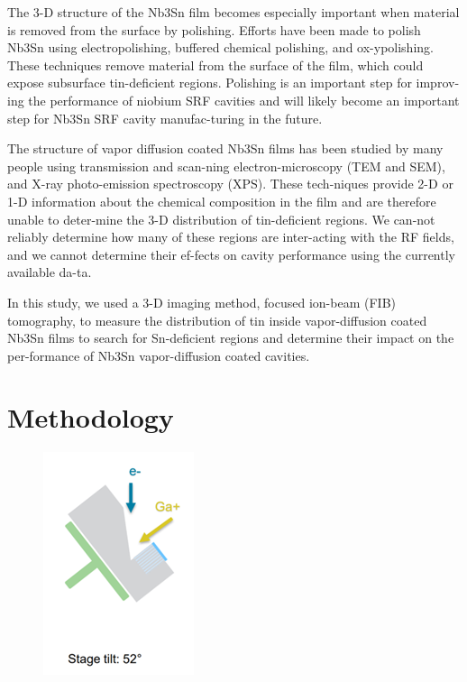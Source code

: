 The 3-D structure of the Nb3Sn film becomes especially important when material is removed from the surface by polishing. Efforts have been made to polish Nb3Sn using electropolishing\cite{hu2019reducing}, buffered chemical polishing\cite{hu2019reducing}, and ox-ypolishing\cite{pudasaini2018studies}. These techniques remove material from the surface of the film, which could expose subsurface tin-deficient regions. Polishing is an important step for improv-ing the performance of niobium SRF cavities and will likely become an important step for Nb3Sn SRF cavity manufac-turing in the future. 

The structure of vapor diffusion coated Nb3Sn films has been studied by many people using transmission and scan-ning electron-microscopy (TEM and SEM)\cite{lee2018atomic,becker2015analysis,hall2017surface,hall2016surface}, and X-ray photo-emission spectroscopy (XPS)\cite{pudasaini2019growth,sun2019fast,hall2016surface}. These tech-niques provide 2-D or 1-D information about the chemical composition in the film and are therefore unable to deter-mine the 3-D distribution of tin-deficient regions. We can-not reliably determine how many of these regions are inter-acting with the RF fields, and we cannot determine their ef-fects on cavity performance using the currently available da-ta. 

In this study, we used a 3-D imaging method, focused ion-beam (FIB) tomography, to measure the distribution of tin inside vapor-diffusion coated Nb3Sn films to search for Sn-deficient regions and determine their impact on the per-formance of Nb3Sn vapor-diffusion coated cavities.

\section{Methodology}

\begin{figure}[htb]%
    \centering%
    \includegraphics[width=0.25\columnwidth]{../figs/Figure-1.png}%
    \caption{}%
    \label{fig:1}%
\end{figure}


